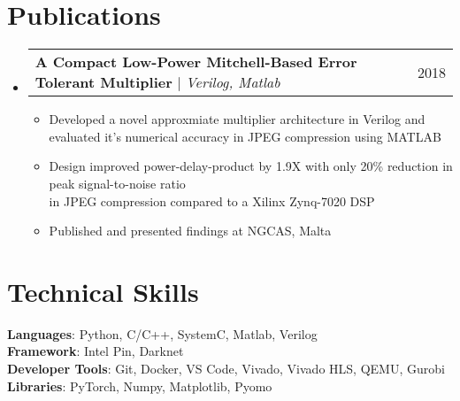 \documentclass[letterpaper,11pt]{article}
\makeatletter
\newcommand{\resumeItem}[1]{
  \item\small{
    {#1 \vspace{-2pt}}
  }
}
\newcommand{\resumeProjectHeading}[2]{
    \item
    \begin{tabular*}{0.97\textwidth}{l@{\extracolsep{\fill}}r}
      \small#1 & #2 \\
    \end{tabular*}\vspace{-7pt}
}
\newcommand{\resumeSubHeadingListStart}{\begin{itemize}[leftmargin=0.15in, label={}]}
\newcommand{\resumeSubHeadingListEnd}{\end{itemize}}
\newcommand{\resumeItemListStart}{\begin{itemize}}
\newcommand{\resumeItemListEnd}{\end{itemize}\vspace{-5pt}}
\makeatother
\begin{document}
\section{Publications}
    \resumeSubHeadingListStart
      \resumeProjectHeading
          {\textbf{A Compact Low-Power Mitchell-Based Error Tolerant Multiplier} $|$ \emph{Verilog, Matlab} }{2018}
          \resumeItemListStart
            \resumeItem{Developed a novel approxmiate multiplier architecture in Verilog and evaluated it's numerical accuracy in JPEG compression using MATLAB }
            \resumeItem{Design improved power-delay-product by 1.9X with only 20\% reduction in peak signal-to-noise ratio \\ in JPEG compression compared to a Xilinx Zynq-7020 DSP}
            \resumeItem{Published and presented findings at NGCAS, Malta}
          \resumeItemListEnd
    \resumeSubHeadingListEnd

%
\section{Technical Skills}
 \begin{itemize}[leftmargin=0.15in, label={}]
    \small{\item{
     \textbf{Languages}{: Python, C/C++, SystemC, Matlab, Verilog} \\
     \textbf{Framework}{: Intel Pin, Darknet} \\
     \textbf{Developer Tools}{: Git, Docker, VS Code, Vivado, Vivado HLS, QEMU, Gurobi} \\
     \textbf{Libraries}{: PyTorch, Numpy, Matplotlib, Pyomo}
    }}
 \end{itemize}

\end{document}
